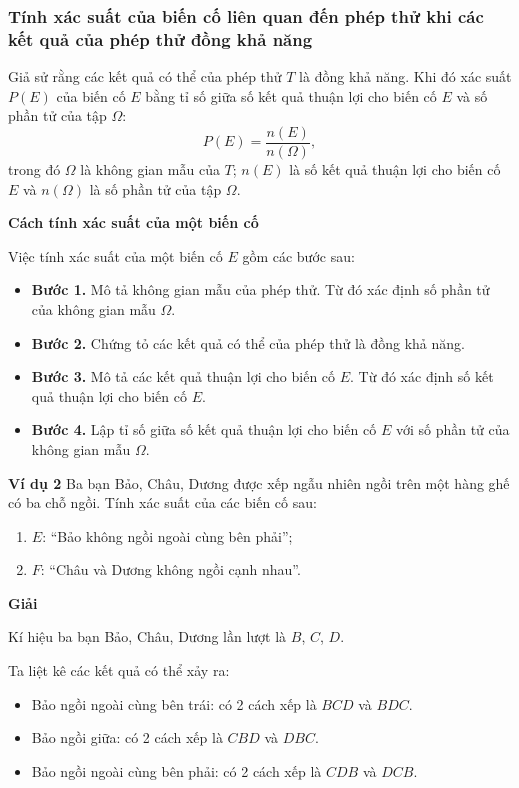 \begin{lesson}
    \subsubsection{Tính xác suất của biến cố liên quan đến phép thử khi các kết quả của phép thử đồng khả năng}

    \begin{keyconcept}
        Giả sử rằng các kết quả có thể của phép thử $T$ là đồng khả năng. Khi đó xác suất $P(E)$ của biến cố $E$ bằng tỉ số giữa số kết quả thuận lợi cho biến cố $E$ và số phần tử của tập $\Omega$:
        \[
            P(E)=\dfrac{n(E)}{n(\Omega)},
        \]
        trong đó $\Omega$ là không gian mẫu của $T$; $n(E)$ là số kết quả thuận lợi cho biến cố $E$ và $n(\Omega)$ là số phần tử của tập $\Omega$.
    \end{keyconcept}

    \textbf{Cách tính xác suất của một biến cố}

    Việc tính xác suất của một biến cố $E$ gồm các bước sau:
    \begin{itemize}
        \item \textbf{Bước 1.} Mô tả không gian mẫu của phép thử. Từ đó xác định số phần tử của không gian mẫu $\Omega$.
        \item \textbf{Bước 2.} Chứng tỏ các kết quả có thể của phép thử là đồng khả năng.
        \item \textbf{Bước 3.} Mô tả các kết quả thuận lợi cho biến cố $E$. Từ đó xác định số kết quả thuận lợi cho biến cố $E$.
        \item \textbf{Bước 4.} Lập tỉ số giữa số kết quả thuận lợi cho biến cố $E$ với số phần tử của không gian mẫu $\Omega$.
    \end{itemize}

    \textbf{Ví dụ 2} Ba bạn Bảo, Châu, Dương được xếp ngẫu nhiên ngồi trên một hàng ghế có ba chỗ ngồi. Tính xác suất của các biến cố sau:
    \begin{enumerate}[label=\alph*)]
        \item $E$: “Bảo không ngồi ngoài cùng bên phải”;
        \item $F$: “Châu và Dương không ngồi cạnh nhau”.
    \end{enumerate}

    \textbf{Giải}

    Kí hiệu ba bạn Bảo, Châu, Dương lần lượt là $B$, $C$, $D$.

    Ta liệt kê các kết quả có thể xảy ra:
    \begin{itemize}
        \item Bảo ngồi ngoài cùng bên trái: có 2 cách xếp là $BCD$ và $BDC$.
        \item Bảo ngồi giữa: có 2 cách xếp là $CBD$ và $DBC$.
        \item Bảo ngồi ngoài cùng bên phải: có 2 cách xếp là $CDB$ và $DCB$.
    \end{itemize}


\end{lesson}
